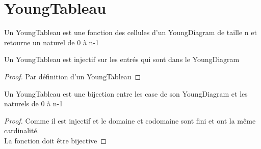 \chapter{YoungTableau}

\begin{definition}[YoungTableau]
    \label{YoungTableau}
    \leanok
    Un YoungTableau est une fonction des cellules d'un YoungDiagram de taille n et retourne un naturel de 0 à n-1
\end{definition}

\begin{lemma}[injYu]
    \label{injYu}
    \leanok
    Un YoungTableau est injectif sur les entrés qui sont dans le YoungDiagram
\end{lemma}
\begin{proof}
    \leanok
    Par définition d'un YoungTableau
\end{proof}

\begin{lemma}[bijYu]
    \label{bijYu}
    \leanok
    Un YoungTableau est une bijection entre les case de son YoungDiagram et les naturels de 0 à n-1
\end{lemma}
\begin{proof}
    \leanok
    Comme il est injectif et le domaine et codomaine sont fini et ont la même cardinalité.\\
    La fonction doit être bijective
\end{proof}

